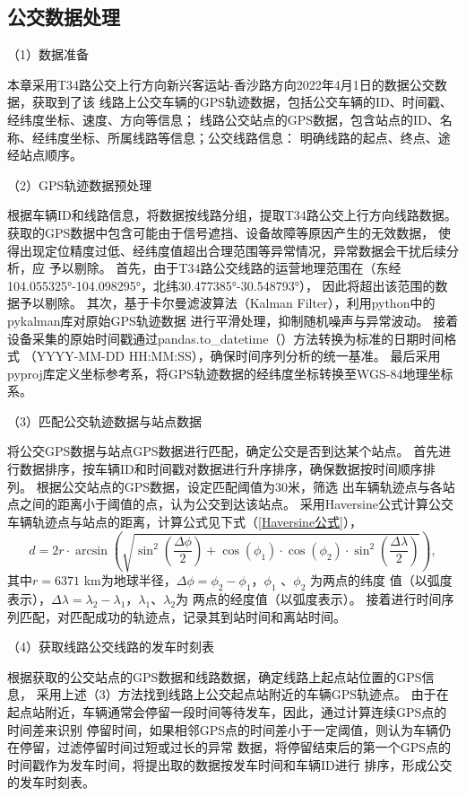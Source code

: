 \subsection{公交数据处理}
（1）数据准备

本章采用T34路公交上行方向新兴客运站-香沙路方向2022年4月1日的数据公交数据，获取到了该
线路上公交车辆的GPS轨迹数据，包括公交车辆的ID、时间戳、经纬度坐标、速度、方向等信息；
线路公交站点的GPS数据，包含站点的ID、名称、经纬度坐标、所属线路等信息；公交线路信息：
明确线路的起点、终点、途经站点顺序。

（2）GPS轨迹数据预处理

根据车辆ID和线路信息，将数据按线路分组，提取T34路公交上行方向线路数据。
获取的GPS数据中包含可能由于信号遮挡、设备故障等原因产生的无效数据，
使得出现定位精度过低、经纬度值超出合理范围等异常情况，异常数据会干扰后续分析，应
予以剔除。
首先，由于T34路公交线路的运营地理范围在（东经104.055325°-104.098295°，北纬30.477385°-30.548793°），
因此将超出该范围的数据予以剔除。
其次，基于卡尔曼滤波算法（Kalman Filter），利用python中的pykalman库对原始GPS轨迹数据
进行平滑处理，抑制随机噪声与异常波动。
接着设备采集的原始时间戳通过pandas.to\_datetime（）方法转换为标准的日期时间格式
（YYYY-MM-DD  HH:MM:SS），确保时间序列分析的统一基准。
最后采用pyproj库定义坐标参考系，将GPS轨迹数据的经纬度坐标转换至WGS-84地理坐标系。

（3）匹配公交轨迹数据与站点数据

将公交GPS数据与站点GPS数据进行匹配，确定公交是否到达某个站点。
首先进行数据排序，按车辆ID和时间戳对数据进行升序排序，确保数据按时间顺序排列。
根据公交站点的GPS数据，设定匹配阈值为30米，筛选
出车辆轨迹点与各站点之间的距离小于阈值的点，认为公交到达该站点。
采用Haversine公式计算公交车辆轨迹点与站点的距离，计算公式见下式（\ref{Haversine公式}），
\begin{equation}\label{Haversine公式}
    d = 2r \cdot \arcsin\left(\sqrt{\sin^2\left(\frac{\Delta \phi}{2}\right) + \cos(\phi_1) \cdot \cos(\phi_2) \cdot \sin^2\left(\frac{\Delta \lambda}{2}\right)}\right),
\end{equation}
其中$r=6371$ km为地球半径，$\Delta \phi=\phi_2-\phi_1$，$\phi_1$ 、$ \phi_2$ 为两点的纬度
值（以弧度表示），$\Delta \lambda=\lambda_2-\lambda_1$，$\lambda_1$、$\lambda_2$为
两点的经度值（以弧度表示）。  
接着进行时间序列匹配，对匹配成功的轨迹点，记录其到站时间和离站时间。

（4）获取线路公交线路的发车时刻表

根据获取的公交站点的GPS数据和线路数据，确定线路上起点站位置的GPS信息，
采用上述（3）方法找到线路上公交起点站附近的车辆GPS轨迹点。
由于在起点站附近，车辆通常会停留一段时间等待发车，因此，通过计算连续GPS点的时间差来识别
停留时间，如果相邻GPS点的时间差小于一定阈值，则认为车辆仍在停留，过滤停留时间过短或过长的异常
数据，将停留结束后的第一个GPS点的时间戳作为发车时间，将提出取的数据按发车时间和车辆ID进行
排序，形成公交的发车时刻表。

